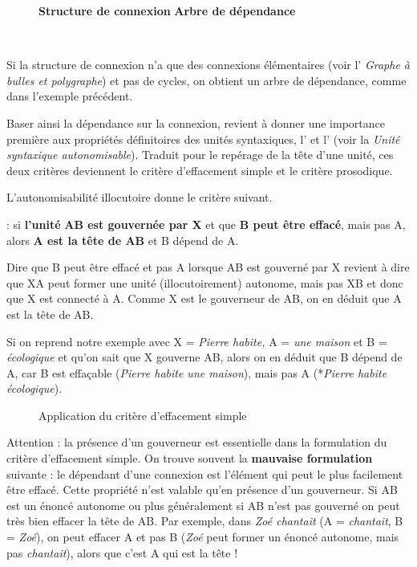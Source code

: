 \begin{figure}

         \textbf{Structure de connexion}         \textbf{Arbre de dépendance}
\caption{\label{fig:}~}
\end{figure}

Si la structure de connexion n’a que des connexions élémentaires (voir l’ \textit{Graphe à bulles et polygraphe}) et pas de cycles, on obtient un arbre de dépendance, comme dans l’exemple précédent.

Baser ainsi la dépendance sur la connexion, revient à donner une importance première aux propriétés définitoires des unités syntaxiques, l’ et l’ (voir la  \textit{Unité syntaxique autonomisable}). Traduit pour le repérage de la tête d’une unité, ces deux critères deviennent le critère d’effacement simple et le critère prosodique.

L’autonomisabilité illocutoire donne le critère suivant.

\begin{styleLivreImportant}
 : si \textbf{l’unité} \textbf{AB est gouvernée par X} et que \textbf{B peut être effacé}, mais pas A, alors \textbf{A est la tête de AB} et B dépend de A.
\end{styleLivreImportant}

Dire que B peut être effacé et pas A lorsque AB est gouverné par X revient à dire que XA peut former une unité (illocutoirement) autonome, mais pas XB et donc que X est connecté à A. Comme X est le gouverneur de AB, on en déduit que A est la tête de AB.

Si on reprend notre exemple avec X = \textit{Pierre habite,} A = \textit{une maison} et B = \textit{écologique} et qu’on sait que X gouverne AB, alors on en déduit que B dépend de A, car B est effaçable (\textit{Pierre habite une maison}), mais pas A (*\textit{Pierre habite écologique}).

\begin{figure}

\caption{\label{fig:}Application du critère d’effacement simple}
\end{figure}

Attention : la présence d’un gouverneur est essentielle dans la formulation du  critère d’effacement simple. On trouve souvent la \textbf{mauvaise formulation} suivante : le dépendant d’une connexion est l’élément qui peut le plus facilement être effacé. Cette propriété n’est valable qu’en présence d’un gouverneur. Si AB est un énoncé autonome ou plus généralement si AB n’est pas gouverné on peut très bien effacer la tête de AB. Par exemple, dans \textit{Zoé chantait} (A = \textit{chantait}, B = \textit{Zoé}), on peut effacer A et pas B (\textit{Zoé} peut former un énoncé autonome, mais pas \textit{chantait}), alors que c’est A qui est la tête !


